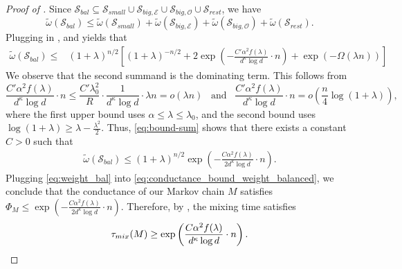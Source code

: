 \documentclass[10pt,a4paper]{amsart}
\newcommand{\cE}{\mathcal{E}}
\newcommand{\cO}{\mathcal{O}}
\newcommand{\cS}{\mathcal{S}}
\newcommand{\ex}{\kappa}
\newcommand{\lam}{\lambda}
\newcommand{\tmix}{\tau_{\rm{mix}}}
\begin{document}
\begin{proof}[Proof of ]
Since $\cS_{bal} \subseteq \cS_{small} \cup \cS_{big, \cE} \cup \cS_{big, \cO} \cup \cS_{rest}$, we have 
    \[
    \tilde{\omega}(\cS_{bal}) \leq \tilde{\omega}(\cS_{small}) + \tilde{\omega}(\cS_{big, \cE}) + \tilde{\omega}(\cS_{big, \cO}) + \tilde{\omega}(\cS_{rest}).
    \]
    Plugging in ,  and  yields that
    \begin{align} \label{eq:bound-sum}
        \tilde{\omega}(\cS_{bal}) \leq &(1+\lambda)^{n/2}\left[(1+\lam)^{-n/2}+2\exp\left( - \frac{C' \alpha^2 f(\lam)}{d^{\ex}\log d} \cdot n\right)+\exp(-\Omega(\lam n))\right]
        \end{align}
    We observe that the second summand is the dominating term.
    This follows from
    \[
    \frac{C' \alpha^2 f(\lam)}{d^{\ex}\log d} \cdot n \leq \frac{C' \lam_0^2}{R} \cdot \frac{1 }{d^{\ex}\log d} \cdot \lam n = o(\lam n) \hspace{10pt} \text{and} \hspace{10pt} \frac{C' \alpha^2 f(\lam)}{d^{\ex}\log d} \cdot n = o\left(\frac{n}{4} \log(1+\lam)\right),
    \]
    where the first upper bound uses $\alpha \leq \lam \leq \lam_0$, and the second bound uses $\log(1+\lambda) \geq \lam - \frac{\lam^2}{2}$. Thus, \eqref{eq:bound-sum} shows that there exists a constant $C > 0$ such that 
    \begin{align} \label{eq:weight_bal}
        \tilde{\omega}(\cS_{bal}) \leq (1+\lambda)^{n/2} \exp\left( - \frac{C \alpha^2 f(\lam) }{2 d^{\ex}\log d} \cdot n\right).
    \end{align}
    Plugging \eqref{eq:weight_bal} into \eqref{eq:conductance_bound_weight_balanced}, we conclude that the conductance of our Markov chain $M$ satisfies $\Phi_M \leq  \exp\left( - \frac{C \alpha^2 f(\lam)}{2 d^{\ex} \log d} \cdot n \right)$. Therefore, by , the mixing time satisfies
    \[
    \tmix(M) \geq \exp\left( \frac{C \alpha^2 f(\lam)}{d^{\ex}\log d} \cdot n \right). \qedhere
    \]
\end{proof}
\end{document}
